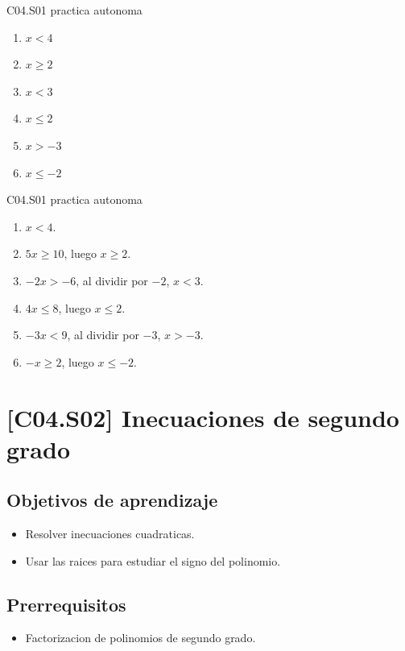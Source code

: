 \begin{shortanswer}{C04.S01 practica autonoma}
\begin{enumerate}[label=\textbf{PX-C04.S01-\arabic*:}, leftmargin=*]
  \item \(x<4\)
  \item \(x\geq 2\)
  \item \(x<3\)
  \item \(x\leq 2\)
  \item \(x>-3\)
  \item \(x\leq -2\)
\end{enumerate}
\end{shortanswer}

\begin{fullsolution}{C04.S01 practica autonoma}
\begin{enumerate}[label=\textbf{PX-C04.S01-\arabic*:}, leftmargin=*]
  \item \(x<4\).
  \item \(5x\geq 10\), luego \(x\geq 2\).
  \item \(-2x>-6\), al dividir por \(-2\), \(x<3\).
  \item \(4x\leq 8\), luego \(x\leq 2\).
  \item \(-3x<9\), al dividir por \(-3\), \(x>-3\).
  \item \(-x\geq 2\), luego \(x\leq -2\).
\end{enumerate}
\end{fullsolution}

\section{[C04.S02] Inecuaciones de segundo grado}

\subsection*{Objetivos de aprendizaje}
\begin{itemize}
  \item Resolver inecuaciones cuadraticas.
  \item Usar las raices para estudiar el signo del polinomio.
\end{itemize}

\subsection*{Prerrequisitos}
\begin{itemize}
  \item Factorizacion de polinomios de segundo grado.
\end{itemize}

